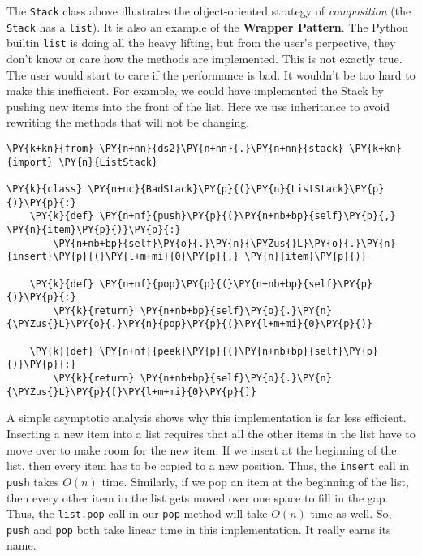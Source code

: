 The \texttt{Stack} class above illustrates the object-oriented strategy of \emph{composition} (the \texttt{Stack} has a \texttt{list}).  It is also an example of the \textbf{Wrapper Pattern}.  The Python builtin \texttt{list} is doing all the heavy lifting, but from the user's perpective, they don't know or care how the methods are implemented.  This is not exactly true.  The user would start to care if the performance is bad.  It wouldn't be too hard to make this inefficient.  For example, we could have implemented the Stack by pushing new items into the front of the list.  Here we use inheritance to avoid rewriting the methods that will not be changing.

\begin{Verbatim}[commandchars=\\\{\}]
\PY{k+kn}{from} \PY{n+nn}{ds2}\PY{n+nn}{.}\PY{n+nn}{stack} \PY{k+kn}{import} \PY{n}{ListStack}

\PY{k}{class} \PY{n+nc}{BadStack}\PY{p}{(}\PY{n}{ListStack}\PY{p}{)}\PY{p}{:}    
    \PY{k}{def} \PY{n+nf}{push}\PY{p}{(}\PY{n+nb+bp}{self}\PY{p}{,} \PY{n}{item}\PY{p}{)}\PY{p}{:}
        \PY{n+nb+bp}{self}\PY{o}{.}\PY{n}{\PYZus{}L}\PY{o}{.}\PY{n}{insert}\PY{p}{(}\PY{l+m+mi}{0}\PY{p}{,} \PY{n}{item}\PY{p}{)}

    \PY{k}{def} \PY{n+nf}{pop}\PY{p}{(}\PY{n+nb+bp}{self}\PY{p}{)}\PY{p}{:}
        \PY{k}{return} \PY{n+nb+bp}{self}\PY{o}{.}\PY{n}{\PYZus{}L}\PY{o}{.}\PY{n}{pop}\PY{p}{(}\PY{l+m+mi}{0}\PY{p}{)}

    \PY{k}{def} \PY{n+nf}{peek}\PY{p}{(}\PY{n+nb+bp}{self}\PY{p}{)}\PY{p}{:}
        \PY{k}{return} \PY{n+nb+bp}{self}\PY{o}{.}\PY{n}{\PYZus{}L}\PY{p}{[}\PY{l+m+mi}{0}\PY{p}{]}
\end{Verbatim}



A simple asymptotic analysis shows why this implementation is far less efficient.
Inserting a new item into a list requires that all the other items in the list have to move over to make room for the new item.
If we insert at the beginning of the list, then every item has to be copied to a new position.  Thus, the \texttt{insert} call in \texttt{push} takes $O(n)$ time.
Similarly, if we pop an item at the beginning of the list, then every other item in the list gets moved over one space to fill in the gap.
Thus, the \texttt{list.pop} call in our \texttt{pop} method will take $O(n)$ time as well.   So, \texttt{push} and \texttt{pop} both take linear time in this implementation.  It really earns its name.

